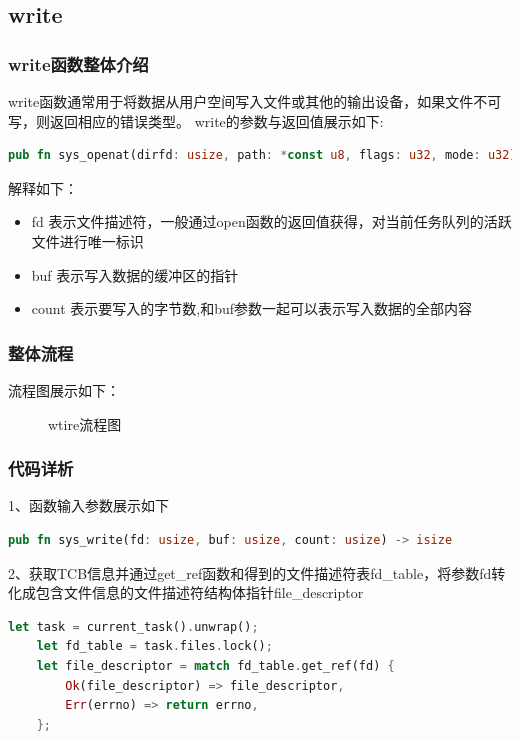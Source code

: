\subsection{write}
\subsubsection{write函数整体介绍}
write函数通常用于将数据从用户空间写入文件或其他的输出设备，如果文件不可写，则返回相应的错误类型。
\noindent
write的参数与返回值展示如下:
\begin{lstlisting}[language={Rust}, 
    caption={write的参数与返回值}]
pub fn sys_openat(dirfd: usize, path: *const u8, flags: u32, mode: u32) -> isize
\end{lstlisting}
解释如下：
\begin{itemize}
    \item fd 表示文件描述符，一般通过open函数的返回值获得，对当前任务队列的活跃文件进行唯一标识
    \item buf 表示写入数据的缓冲区的指针
    \item count 表示要写入的字节数,和buf参数一起可以表示写入数据的全部内容
\end{itemize}
\subsubsection{整体流程}
流程图展示如下：
\begin{figure}[H]
    \centering
    \caption{wtire流程图}
\end{figure}

\subsubsection{代码详析}
1、函数输入参数展示如下
\begin{lstlisting}[language={Rust},
    caption={write的参数与返回值}]
    pub fn sys_write(fd: usize, buf: usize, count: usize) -> isize
\end{lstlisting}

2、获取TCB信息并通过get_ref函数和得到的文件描述符表fd_table，将参数fd转化成包含文件信息的文件描述符结构体指针file_descriptor
\begin{lstlisting}[language={Rust},
    caption={含有文件信息文件描述符指针的获取}]
    let task = current_task().unwrap();
    let fd_table = task.files.lock();
    let file_descriptor = match fd_table.get_ref(fd) {
        Ok(file_descriptor) => file_descriptor,
        Err(errno) => return errno,
    };
\end{lstlisting}

